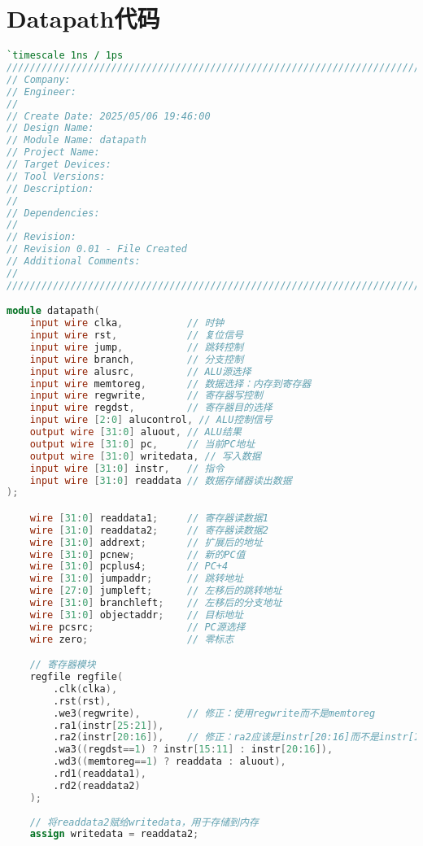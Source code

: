 \appendix
\newpage
\section{Datapath代码}
\begin{lstlisting}[language=Verilog]
`timescale 1ns / 1ps
//////////////////////////////////////////////////////////////////////////////////
// Company: 
// Engineer: 
// 
// Create Date: 2025/05/06 19:46:00
// Design Name: 
// Module Name: datapath
// Project Name: 
// Target Devices: 
// Tool Versions: 
// Description: 
// 
// Dependencies: 
// 
// Revision:
// Revision 0.01 - File Created
// Additional Comments:
// 
//////////////////////////////////////////////////////////////////////////////////

module datapath(
    input wire clka,           // 时钟
    input wire rst,            // 复位信号
    input wire jump,           // 跳转控制
    input wire branch,         // 分支控制
    input wire alusrc,         // ALU源选择
    input wire memtoreg,       // 数据选择：内存到寄存器
    input wire regwrite,       // 寄存器写控制
    input wire regdst,         // 寄存器目的选择
    input wire [2:0] alucontrol, // ALU控制信号
    output wire [31:0] aluout, // ALU结果
    output wire [31:0] pc,     // 当前PC地址
    output wire [31:0] writedata, // 写入数据
    input wire [31:0] instr,   // 指令
    input wire [31:0] readdata // 数据存储器读出数据
);

    wire [31:0] readdata1;     // 寄存器读数据1
    wire [31:0] readdata2;     // 寄存器读数据2
    wire [31:0] addrext;       // 扩展后的地址
    wire [31:0] pcnew;         // 新的PC值
    wire [31:0] pcplus4;       // PC+4
    wire [31:0] jumpaddr;      // 跳转地址
    wire [27:0] jumpleft;      // 左移后的跳转地址
    wire [31:0] branchleft;    // 左移后的分支地址
    wire [31:0] objectaddr;    // 目标地址
    wire pcsrc;                // PC源选择
    wire zero;                 // 零标志

    // 寄存器模块
    regfile regfile(
        .clk(clka),
        .rst(rst),
        .we3(regwrite),        // 修正：使用regwrite而不是memtoreg
        .ra1(instr[25:21]),
        .ra2(instr[20:16]),    // 修正：ra2应该是instr[20:16]而不是instr[15:11]
        .wa3((regdst==1) ? instr[15:11] : instr[20:16]),
        .wd3((memtoreg==1) ? readdata : aluout),
        .rd1(readdata1),
        .rd2(readdata2)
    );
    
    // 将readdata2赋给writedata，用于存储到内存
    assign writedata = readdata2;


\end{lstlisting}
